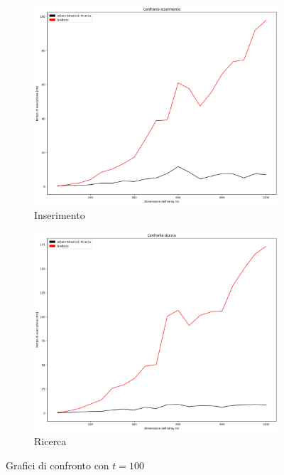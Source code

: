 \begin{figure}[H]
    \centering
    \begin{subfigure}[b]{0.49\textwidth}
        \centering
        \includegraphics[width=\textwidth]{comparison-graphs/insert-ms-t100.png}
        \caption{Inserimento}
        \label{fig:compgraphinserttimet100}
    \end{subfigure}
    \hfill
    \begin{subfigure}[b]{0.49\textwidth}
        \centering
        \includegraphics[width=\textwidth]{comparison-graphs/search-ms-t100.png}
        \caption{Ricerca}
        \label{fig:compgraphsearchtimet100}
    \end{subfigure}
    \caption{Grafici di confronto con $t=100$}
    \label{fig:compgraphtimest100}
\end{figure}

